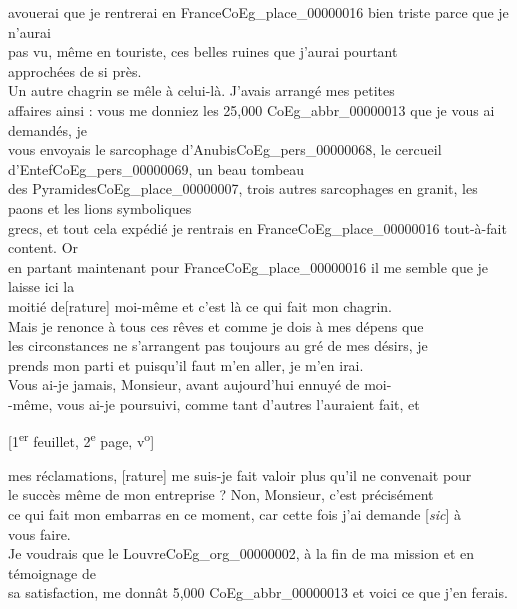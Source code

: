\documentclass{book}
\begin{document}
avouerai que je rentrerai en France\gls{CoEg_place_00000016} bien triste parce que je n’aurai\\
pas vu, même en touriste, ces belles ruines que j’aurai pourtant\\
approchées de si près.\\
\indent Un autre chagrin se mêle à celui-là. J’avais arrangé mes petites\\
affaires ainsi : vous me donniez les 25,000 \gls{CoEg_abbr_00000013} que je vous ai demandés, je\\
vous envoyais le sarcophage d’Anubis\gls{CoEg_pers_00000068}, le cercueil d’Entef\gls{CoEg_pers_00000069}, un beau tombeau\\
des Pyramides\gls{CoEg_place_00000007}, trois autres sarcophages en granit, les paons et les lions symboliques\\
grecs, et tout cela expédié je rentrais en France\gls{CoEg_place_00000016} tout-à-fait content. Or\\
en partant maintenant pour France\gls{CoEg_place_00000016} il me semble que je laisse ici la\\
moitié de[rature] moi-même et c’est là ce qui fait mon chagrin.\\
\indent Mais je renonce à tous ces rêves et comme je dois à mes dépens que\\
les circonstances ne s’arrangent pas toujours au gré de mes désirs, je\\
prends mon parti et puisqu’il faut m’en aller, je m’en irai.\\
\indent Vous ai-je jamais, Monsieur, avant aujourd’hui ennuyé de moi-\\
-même, vous ai-je poursuivi, comme tant d’autres l’auraient fait, et
{\footnotesize\begin{center} {[1\textsuperscript{er} feuillet, 2\textsuperscript{e} page, v\textsuperscript{o}]}\end{center}}
\noindent mes réclamations, [rature] me suis-je fait valoir plus qu’il ne convenait pour\\
le succès même de mon entreprise ? Non, Monsieur, c’est précisément\\
ce qui fait mon embarras en ce moment, car cette fois j’ai demande {[\textit{sic}]} à\\
vous faire.\\
\indent Je voudrais que le Louvre\gls{CoEg_org_00000002}, à la fin de ma mission et en témoignage de\\
sa satisfaction, me donnât 5,000 \gls{CoEg_abbr_00000013} et voici ce que j’en ferais.\\
\end{document}
